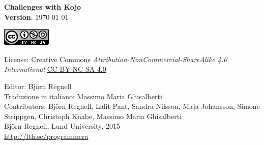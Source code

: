 { \vspace{250mm}\fontsize{11}{11}\flushleft\selectfont 
\vspace*{\fill}

\begin{center}
\Huge {\bf Challenges with Kojo}\\
\Large {\bf Version}: \today{ }
\end{center}
\vskip7cm

\large
\includegraphics{../img/cc.png}

License: Creative Commons {\it Attribution-NonCommercial-ShareAlike 4.0 International} 
\href{http://creativecommons.org/licenses/by-nc-sa/4.0/}{CC BY-NC-SA 4.0}

Editor: Björn Regnell\\
Traduzione in italiano: Massimo Maria Ghisalberti\\
Contributors: Björn Regnell, Lalit Pant, Sandra Nilsson, Maja Johansson, Simone Strippgen, Christoph Knabe, Massimo Maria Ghisalberti\\
\textcopyright{ }Björn Regnell, Lund University, 2015 \\
\url{http://lth.se/programmera}
}
